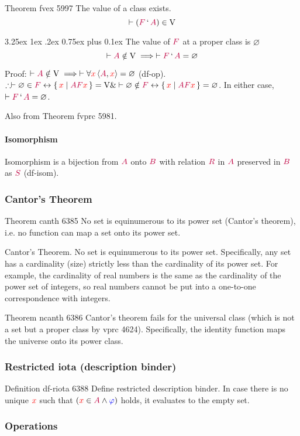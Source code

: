 \documentclass[12pt, letterpaper]{article}
\makeatletter
\renewcommand\subparagraph{\@startsection{subparagraph}{5}{\parindent}%
	{3.25ex \@plus1ex \@minus .2ex}%
	{0.75ex plus 0.1ex}%
	{\normalfont\normalsize\bfseries}}
\newcommand{\red}[1]{{\color{red} #1}}
\newcommand{\blue}[1]{{\color{blue} #1}}
\newcommand{\purple}[1]{{\color{purple} #1}}
\renewcommand{\emptyset}{\varnothing}
\newcommand{\provable}{\vdash}
\newcommand{\lra}{\leftrightarrow}
\newcommand{\setvar}{\red}
\newcommand{\wff}{\blue}
\newcommand{\classvar}{\purple}
\newcommand{\wffphi}{\wff{\varphi}}
\newcommand{\sx}{\setvar{x}}
\newcommand{\clA}{\classvar{A}}
\newcommand{\clB}{\classvar{B}}
\newcommand{\clF}{\classvar{F}}
\newcommand{\clR}{\classvar{R}}
\newcommand{\clS}{\classvar{S}}
\newcommand{\VV}{\mathrm{V}}
\newcommand{\at}{\,`\,}
\newcommand{\opair}[2]{\left\langle{{#1},{#2}}\right\rangle}
\theoremstyle{definition}
\theoremstyle{remark}
\theoremstyle{definition}
\theoremstyle{plain}
\makeatother
\begin{document}
	Theorem	fvex 5997	The value of a class exists.
	\[\provable (\clF\at\clA)\in\VV \]
	
	\subparagraph{The value of $\clF$ at a proper class is $\emptyset$}
	\label{par:func_at_proper_class}
	\[
	\provable \clA\notin\VV\implies\provable\clF\at\clA=\emptyset	\]
	
	Proof: $\provable\clA\notin\VV\implies\provable\forall\sx\opair{\clA}{\sx}=\emptyset$ (df-op). $\therefore 
	\provable\emptyset\in\clF \lra \set{\sx|\clA\clF\sx}=\VV \&\provable\emptyset\notin\clF \lra \set{\sx|\clA\clF\sx}=\emptyset$. In either case, $\provable \clF\at\clA=\emptyset$.
	
	Also from Theorem	fvprc 5981.

	\paragraph{Isomorphism}
	Isomorphism is a bijection from $\clA$ onto $\clB$
	with relation $\clR$ in $\clA$ preserved in $\clB$ as $\clS$ (df-isom).

	\subsubsection{Cantor's Theorem}
	Theorem	canth 6385	No set is equinumerous to its power set (Cantor's theorem), i.e. no function can map a set onto its power set.
	
	Cantor's Theorem. No set is equinumerous to its power set. Specifically, any set has a cardinality (size) strictly less than the cardinality of its power set. For example, the cardinality of real numbers is the same as the cardinality of the power set of integers, so real numbers cannot be put into a one-to-one correspondence with integers.
	
	Theorem	ncanth 6386	Cantor's theorem fails for the universal class (which is not a set but a proper class by vprc 4624). Specifically, the identity function maps the universe onto its power class.	
	
	\subsubsection{Restricted iota (description binder)}
	Definition	df-riota 6388	Define restricted description binder. In case there is no unique $\sx$ such that $(\sx \in \clA \land \wffphi)$ holds, it evaluates to the empty set. 
	
	\subsubsection{Operations}
	
\end{document}
